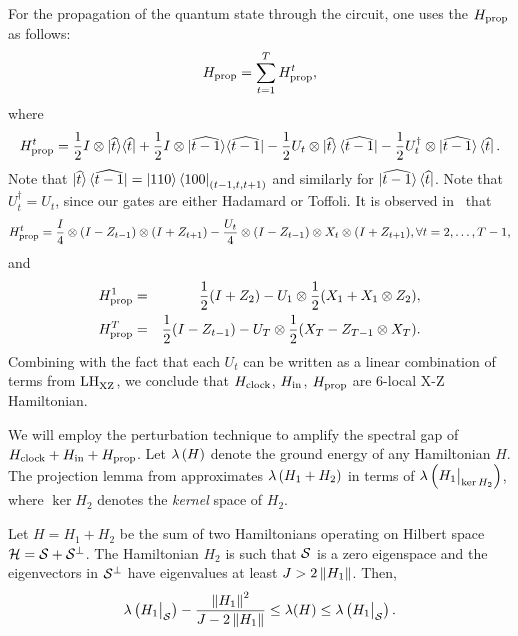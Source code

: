 For the propagation of the quantum state through the circuit, one uses the $H_{\mathrm{prop}}$ as follows:
\begin{equation} \label{eqn:Hprop}
    H_{\mathrm{prop}}=\sum_{t=1}^T H_{\mathrm{prop}}^t,
\end{equation}
where
\begin{equation}
    H_{\mathrm{prop}}^t=\frac{1}{2}I\otimes|\widehat{t}\rangle\langle \widehat{t}|
    +\frac{1}{2}I\otimes|\widehat{t-1}\rangle\langle \widehat{t-1}|
    -\frac{1}{2} U_t\otimes\ket{\widehat{t}}\bra{\widehat{t-1}}
    -\frac{1}{2}U_t^\dagger\otimes\ket{\widehat{t-1}}\bra{\widehat{t}}.
\end{equation}
Note that $\ket{\widehat{t}}\bra{\widehat{t-1}}=\ket{110}\bra{100}_{(t-1,t,t+1)}$ and similarly for $\ket{\widehat{t-1}}\bra{\widehat{t}}$.
Note that $U_t^\dagger=U_t$, since our gates are either Hadamard or Toffoli. It is observed in~\cite{PhysRevA.78.012352} that
\begin{equation}
   H_{\mathrm{prop}}^t=\frac{I}{4}\otimes(I-Z_{t-1})\otimes (I+Z_{t+1})-\frac{U_t}{4}\otimes(I-Z_{t-1})\otimes X_t\otimes (I+Z_{t+1}), \forall t=2, \ldots, T-1,
\end{equation}
and
\begin{eqnarray}
  H_{\mathrm{prop}}^1 &= & \frac{1}{2}(I+Z_2)-U_1\otimes\frac{1}{2}(X_1+X_1\otimes Z_2), \\
  H_{\mathrm{prop}}^T &= & \frac{1}{2}(I-Z_{t-1})-U_T\otimes\frac{1}{2}(X_T-Z_{T-1}\otimes X_T).
\end{eqnarray}
Combining with the fact that each $U_t$ can be written as a linear combination of terms from $\mathrm{LH}_{\mathrm{XZ}}^{}$, we conclude that $H_{\mathrm{clock}}$, $H_{\mathrm{in}}$, $H_{\mathrm{prop}}$ are 6-local X-Z Hamiltonian.

We will employ the perturbation technique to amplify the spectral gap of $H_{\mathrm{clock}} + H_{\mathrm{in}} + H_{\mathrm{prop}}$.
Let ${\lambda \left (H \right)}$ denote the ground energy of any Hamiltonian $H$.
The projection lemma from \cite{kempe_kitaev_regev_2006} approximates ${\lambda \left (H_1 + H_2 \right)}$ in terms of ${\lambda \left (H_1\big|_{\ker H_2} \right)}$, where $\ker H_2$ denotes the \emph{kernel} space of $H_2$.

\begin{lem}
    \label{thm:proj1}
    Let $H=H_1+H_2$ be the sum of two Hamiltonians operating on Hilbert space $\mathcal{H}=\mathcal{S}+\mathcal{S}^\bot$.
    The Hamiltonian $H_2$ is such that $\mathcal{S}$ is a zero eigenspace and the eigenvectors in $\mathcal{S}^\bot$ have eigenvalues at least $J>2\left\lVert H_1\right\rVert$. Then,
    $$\lambda\left(H_1\big|_{\mathcal{S}}\right)-\frac{\left\lVert H_1\right\rVert^2}{J-2\left\lVert H_1\right\rVert}\leq\lambda(H)\leq\lambda\left(H_1\big|_{\mathcal{S}}\right).$$
\end{lem}

